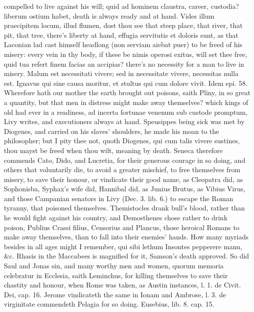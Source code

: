 compelled to live against his will;  quid ad hominem claustra,
career, custodia? liberum ostium habet, death is always ready and at
hand. Vides illum praecipitem locum, illud flumen, dost thou see that
steep place, that river, that pit, that tree, there's liberty at hand,
effugia servitutis et doloris sunt, as that Laconian lad cast himself
headlong (non serviam aiebat puer) to be freed of his misery: every
vein in thy body, if these be nimis operosi exitus, will set thee free,
quid tua refert finem facias an accipias? there's no necessity for a
man to live in misery. Malum est necessitati vivere; sed in necessitate
vivere, necessitas nulla est. Ignavus qui sine causa moritur, et
stultus qui cum dolore vivit. Idem epi. 58. Wherefore hath our mother
the earth brought out poisons, saith Pliny, in so great a
quantity, but that men in distress might make away themselves? which
kings of old had ever in a readiness, ad incerta fortunae venenum sub
custode promptum, Livy writes, and executioners always at hand.
Speusippes being sick was met by Diogenes, and carried on his slaves'
shoulders, he made his moan to the philosopher; but I pity thee not,
quoth Diogenes, qui cum talis vivere sustines, thou mayst be freed when
thou wilt, meaning by death. Seneca therefore commends Cato,
Dido, and Lucretia, for their generous courage in so doing, and others
that voluntarily die, to avoid a greater mischief, to free themselves
from misery, to save their honour, or vindicate their good name, as
Cleopatra did, as Sophonisba, Syphax's wife did, Hannibal did, as
Junius Brutus, as Vibius Virus, and those Campanian senators in Livy
(Dec. 3. lib. 6.) to escape the Roman tyranny, that poisoned
themselves. Themistocles drank bull's blood, rather than he would fight
against his country, and Demosthenes chose rather to drink poison,
Publius Crassi filius, Censorius and Plancus, those heroical Romans to
make away themselves, than to fall into their enemies' hands. How many
myriads besides in all ages might I remember, qui sibi lethum Insontes
pepperere manu, \&c. Rhasis in the Maccabees is magnified for it,
Samson's death approved. So did Saul and Jonas sin, and many worthy men
and women, quorum memoria celebratur in Ecclesia, saith
Leminchus, for killing themselves to save their chastity and
honour, when Rome was taken, as Austin instances, l. 1. de Civit. Dei,
cap. 16. Jerome vindicateth the same in Ionam and Ambrose, l. 3. de
virginitate commendeth Pelagia for so doing. Eusebius, lib. 8. cap. 15.
